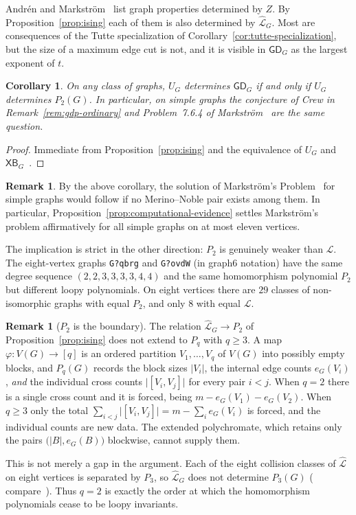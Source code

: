 \documentclass[11pt]{article}
\theoremstyle{plain}
\newtheorem{corollary}[theorem]{Corollary}
\theoremstyle{definition}
\newtheorem{remark}[theorem]{Remark}
\renewcommand{\mathcal}{\mathscr}
\newcommand{\LL}{\mathcal{L}}    %
\newcommand{\GD}{\mathsf{GD}}    %
\newcommand{\XB}{\mathsf{XB}} %
\numberwithin{equation}{section}
\begin{document}
Andr\'en and Markstr\"om~\cite[Theorem~4.3]{AM} list graph properties determined by $Z$. By Proposition~\ref{prop:ising} each of them is also
determined by $\widehat{\LL}_G$.  Most are consequences of the Tutte specialization
of Corollary~\ref{cor:tutte-specialization}, but the size of a maximum edge cut is not, and it is
visible in $\GD_G$ as the largest exponent of $t$.

\begin{corollary}\label{cor:crew-markstrom}
On any class of graphs, $U_G$ determines $\GD_G$ if and only if $U_G$ determines $P_2(G)$.
In particular, on simple graphs the conjecture of Crew in Remark~\ref{rem:gdp-ordinary}
and Problem~7.6.4 of Markstr\"om~\cite{Mar} are the same question.
\end{corollary}

\begin{proof}
Immediate from Proposition~\ref{prop:ising} and the equivalence of $U_G$ and $\XB_G$~\cite{NW,Sar,MN,Nob}.
\end{proof}

\begin{remark}
  \label{rem:markstrom-problem}
By the above corollary, the solution of Markstr\"om's Problem~\cite[7.6.4]{Mar}
for simple graphs would follow if no Merino--Noble pair exists among them.
In particular, Proposition~\ref{prop:computational-evidence} settles Markstr\"om's problem affirmatively
for all simple graphs on at most eleven vertices.

The implication is strict in the other direction: $P_2$ is genuinely weaker than $\LL$.
  The eight-vertex graphs \verb+G?qbrg+ and \verb+G?ovdW+ (in graph6 notation) have the same degree sequence $(2,2,3,3,3,3,4,4)$ and the same homomorphism polynomial $P_2$ but different loopy polynomials.
  On eight vertices there are $29$ classes of non-isomorphic graphs with equal $P_2$,
  and only $8$ with equal $\LL$.
\end{remark}

\begin{remark}[$P_2$ is the boundary]\label{rem:P3-boundary}
The relation $\widehat{\LL}_G\to P_2$ of Proposition~\ref{prop:ising} does not extend to $P_q$ with $q\ge 3$.  A map $\varphi:V(G)\to[q]$ is
  an ordered partition $V_1,\dots,V_q$ of $V(G)$ into possibly empty blocks, and $P_q(G)$ records
the block sizes $|V_i|$, the internal edge counts $e_G(V_i)$, \emph{and} the
individual cross counts $\bigl|[V_i,V_j]\bigr|$ for every pair $i<j$.  When
$q=2$ there is a single cross count and it is forced, being
$m-e_G(V_1)-e_G(V_2)$.  When $q\ge 3$ only the total
$\sum_{i<j}\bigl|[V_i,V_j]\bigr|=m-\sum_i e_G(V_i)$ is forced, and the individual counts are new data. The extended polychromate, which retains
only the pairs $\bigl(|B|,e_G(B)\bigr)$ blockwise, cannot supply them.

This is not merely a gap in the argument.  Each of the eight collision
classes of $\widehat{\LL}$ on eight vertices is separated by $P_3$, so
$\widehat{\LL}_G$ does not determine $P_3(G)$ (
compare~\cite[Observation~7.6.3]{Mar}).  Thus $q=2$ is exactly the order at
which the homomorphism polynomials cease to be loopy invariants.
\end{remark}
\end{document}
